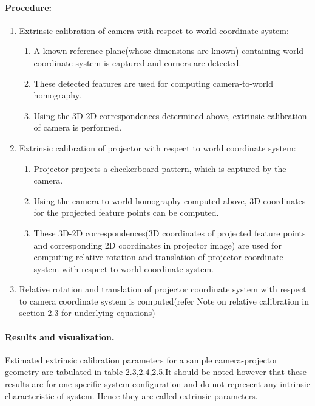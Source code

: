 \paragraph{Procedure:}
\begin{enumerate} 
\item Extrinsic calibration of camera with respect to world coordinate system:  
\begin{enumerate}
\item A known reference plane(whose dimensions are known) containing world coordinate system is captured and corners are detected.  
\item These detected features are used for computing camera-to-world homography.  
\item Using the 3D-2D correspondences determined above, extrinsic calibration of camera is performed.  
\end{enumerate}
\item Extrinsic calibration of projector with respect to world coordinate system:  
\begin{enumerate}
\item Projector projects a checkerboard pattern, which is captured by the camera.  
\item Using the camera-to-world homography computed above, 3D coordinates for the projected feature points can be computed.  
\item These  3D-2D correspondences(3D coordinates of projected feature points and corresponding 2D coordinates in projector image) are used for computing relative rotation and translation of projector coordinate system with respect to world coordinate system.  
\end{enumerate}
\item Relative rotation and translation of projector coordinate system with respect to camera coordinate system is computed(refer Note on relative calibration in section 2.3 for underlying equations)  
\end{enumerate}  
  
\paragraph{Results and visualization.}  
Estimated extrinsic calibration parameters for a sample camera-projector geometry are tabulated in table 2.3,2.4,2.5.It should be noted however that these results are for one specific system configuration and do not represent any intrinsic characteristic of system. Hence they are called extrinsic parameters.\newline  

